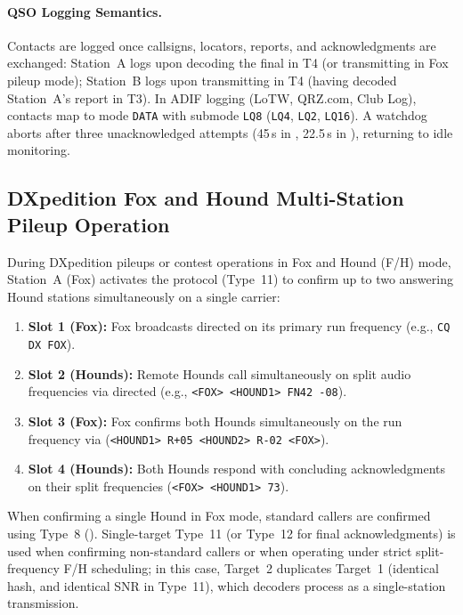 \paragraph{QSO Logging Semantics.}
Contacts are logged once callsigns, locators, reports, and acknowledgments are exchanged: Station~A logs upon decoding the final  in T4 (or transmitting  in Fox pileup mode); Station~B logs upon transmitting  in T4 (having decoded Station~A's report in T3). In ADIF logging (LoTW, QRZ.com, Club Log), contacts map to mode \texttt{DATA} with submode \texttt{LQ8} (\texttt{LQ4}, \texttt{LQ2}, \texttt{LQ16}). A watchdog aborts after three unacknowledged attempts (45\,s in , 22.5\,s in ), returning to idle monitoring.

\subsection{DXpedition Fox and Hound Multi-Station Pileup Operation}
\label{sec:qso:pileup}

During DXpedition pileups or contest operations in Fox and Hound (F/H) mode, Station~A (Fox) activates the  protocol (Type~11) to confirm up to two answering Hound stations simultaneously on a single carrier:
\begin{enumerate}[leftmargin=1.4em, itemsep=0.8pt plus 1.0pt minus 0.4pt, topsep=1.5pt plus 1.0pt minus 0.5pt, parsep=0pt]
  \item \textbf{Slot 1 (Fox):} Fox broadcasts directed  on its primary run frequency (e.g., \texttt{CQ DX FOX}).
  \item \textbf{Slot 2 (Hounds):} Remote Hounds call simultaneously on split audio frequencies via directed  (e.g., \texttt{<FOX> <HOUND1> FN42 -08}).
  \item \textbf{Slot 3 (Fox):} Fox confirms both Hounds simultaneously on the run frequency via  (\texttt{<HOUND1> R+05 <HOUND2> R-02 <FOX>}).
  \item \textbf{Slot 4 (Hounds):} Both Hounds respond with concluding  acknowledgments on their split frequencies (\texttt{<FOX> <HOUND1> 73}).
\end{enumerate}
When confirming a single Hound in Fox mode, standard callers are confirmed using Type~8 (). Single-target Type~11 (or Type~12 for final acknowledgments) is used when confirming non-standard callers or when operating under strict split-frequency F/H scheduling; in this case, Target~2 duplicates Target~1 (identical hash, and identical SNR in Type~11), which decoders process as a single-station transmission.


